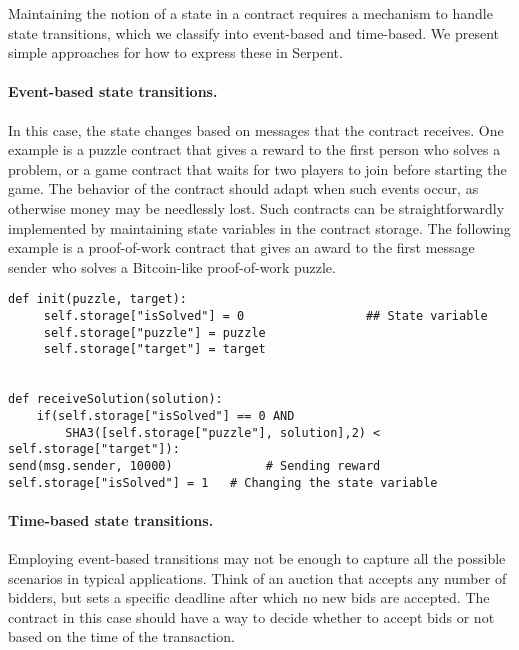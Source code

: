 \documentclass[10pt,twocolumn,letterpaper]{article}
\begin{document}
Maintaining the notion of a state in a contract requires a mechanism to handle state transitions, which we classify into event-based and time-based. We present simple approaches for how to express these in Serpent.

\paragraph{Event-based state transitions.}

In this case, the state changes based on messages that the contract receives. One example is a puzzle contract that gives a reward to the first person who solves a problem, or a game contract that waits for two players to join before starting the game. The behavior of the contract should adapt when such events occur, as otherwise money may be needlessly lost. Such contracts can be straightforwardly implemented by maintaining state variables in the contract storage. The following example is a proof-of-work contract that gives an award to the first message sender who solves a Bitcoin-like proof-of-work puzzle.

\begin{mdframed}
\begin{verbatim}
def init(puzzle, target):
     self.storage["isSolved"] = 0                 ## State variable
     self.storage["puzzle"] = puzzle
     self.storage["target"] = target           
 

def receiveSolution(solution):
    if(self.storage["isSolved"] == 0 AND 
    	SHA3([self.storage["puzzle"], solution],2) < self.storage["target"]):
send(msg.sender, 10000)             # Sending reward
self.storage["isSolved"] = 1   # Changing the state variable
\end{verbatim}
\end{mdframed}




\paragraph{Time-based state transitions.}
Employing event-based transitions may not be enough to capture all the possible scenarios in typical applications. Think of an auction that accepts any number of bidders, but sets a specific deadline after which no new bids are accepted. The contract in this case should have a way to decide whether to accept bids or not based on the time of the transaction.
\end{document}
